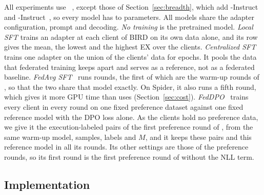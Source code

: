 All experiments use ~\cite{hui2024qwen25coder}, except
those of Section~\ref{sec:breadth}, which add -Instruct
and -Instruct~\cite{guo2024deepseekcoder}, so every model
has  to  parameters. All
models share the adapter configuration, prompt and decoding. \textit{No
training} is the pretrained model. \textit{Local SFT} trains an adapter
at each client of BIRD on its own data alone, and its row gives the mean,
the lowest and the highest EX over the clients. \textit{Centralized SFT}
trains one adapter on the union of the clients' data for
 epochs. It pools the data that federated
training keeps apart and serves as a reference, not as a federated
baseline.
\textit{FedAvg SFT}~\cite{mcmahan2017fedavg,ye2024openfedllm} runs
 rounds, the first  of which
are the warm-up rounds of \method, so that the two share that model
exactly. On Spider, it also runs a fifth round, which gives it more GPU
time than \method{} uses (Section~\ref{sec:cost}).
\textit{FedDPO}~\cite{ye2024openfedllm} trains every
client in every round on one fixed preference dataset against one fixed
reference model with the DPO loss alone. As the clients hold no
preference data, we give it the execution-labeled pairs of the first
preference round of \method, from the same warm-up model, samples,
labels and $M$, and it keeps these pairs and this reference model in all
its rounds. Its other settings are those of the preference rounds, so its
first round is the first preference round of \method{} without the NLL
term.

\subsection{Implementation}\label{sec:implementation}

